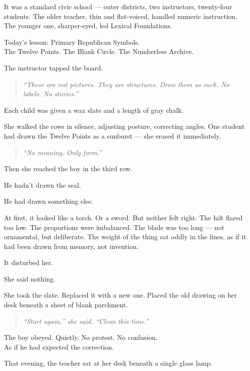 \documentclass[12pt]{article}
\begin{document}
It was a standard civic school --- outer districts, two instructors, twenty-four students. The older teacher, thin and flat-voiced, handled numeric instruction. The younger one, sharper-eyed, led Lexical Foundations.

Today’s lesson: Primary Republican Symbols.\\
The Twelve Points. The Blank Circle. The Numberless Archive.

The instructor tapped the board.

\begin{quote}
\textit{“These are not pictures. They are structures. Draw them as such. No labels. No stories.”}
\end{quote}

Each child was given a wax slate and a length of gray chalk.

She walked the rows in silence, adjusting posture, correcting angles. One student had drawn the Twelve Points as a sunburst --- she erased it immediately.

\begin{quote}
\textit{“No meaning. Only form.”}
\end{quote}

Then she reached the boy in the third row.

He hadn’t drawn the seal.

He had drawn something else.

At first, it looked like a torch. Or a sword. But neither felt right. The hilt flared too low. The proportions were imbalanced. The blade was too long --- not ornamental, but deliberate. The weight of the thing sat oddly in the lines, as if it had been drawn from memory, not invention.

It disturbed her.

She said nothing.

She took the slate. Replaced it with a new one. Placed the old drawing on her desk beneath a sheet of blank parchment.

\begin{quote}
\textit{“Start again,” she said. “Clean this time.”}
\end{quote}

The boy obeyed. Quietly. No protest. No confusion.\\
As if he had expected the correction.

\vspace{1em}

That evening, the teacher sat at her desk beneath a single glass lamp.
\end{document}
